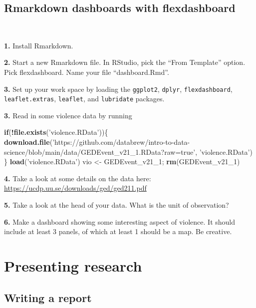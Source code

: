 \documentclass[]{book}
\newenvironment{Shaded}{\begin{snugshade}}{\end{snugshade}}
\newcommand{\ControlFlowTok}[1]{\textcolor[rgb]{0.13,0.29,0.53}{\textbf{#1}}}
\newcommand{\DecValTok}[1]{\textcolor[rgb]{0.00,0.00,0.81}{#1}}
\newcommand{\KeywordTok}[1]{\textcolor[rgb]{0.13,0.29,0.53}{\textbf{#1}}}
\newcommand{\NormalTok}[1]{#1}
\newcommand{\OperatorTok}[1]{\textcolor[rgb]{0.81,0.36,0.00}{\textbf{#1}}}
\newcommand{\StringTok}[1]{\textcolor[rgb]{0.31,0.60,0.02}{#1}}
\begin{document}
\hypertarget{rmarkdown-dashboards-with-flexdashboard}{%
\chapter{Rmarkdown dashboards with flexdashboard}\label{rmarkdown-dashboards-with-flexdashboard}}

~

\textbf{1.} Install Rmarkdown.

\textbf{2.} Start a new Rmarkdown file. In RStudio, pick the ``From Template'' option. Pick flexdashboard. Name your file ``dashboard.Rmd''.

\textbf{3.} Set up your work space by loading the \texttt{ggplot2}, \texttt{dplyr}, \texttt{flexdashboard}, \texttt{leaflet.extras}, \texttt{leaflet}, and \texttt{lubridate} packages.

\textbf{3.} Read in some violence data by running

\begin{Shaded}
\begin{Highlighting}[]
\ControlFlowTok{if}\NormalTok{(}\OperatorTok{!}\KeywordTok{file.exists}\NormalTok{(}\StringTok{'violence.RData'}\NormalTok{))\{}
  \KeywordTok{download.file}\NormalTok{(}\StringTok{'https://github.com/databrew/intro-to-data-science/blob/main/data/GEDEvent_v21_1.RData?raw=true'}\NormalTok{, }\StringTok{'violence.RData'}\NormalTok{)}
\NormalTok{\}}
\KeywordTok{load}\NormalTok{(}\StringTok{'violence.RData'}\NormalTok{)}
\NormalTok{vio <-}\StringTok{ }\NormalTok{GEDEvent_v21_}\DecValTok{1}\NormalTok{; }\KeywordTok{rm}\NormalTok{(GEDEvent_v21_}\DecValTok{1}\NormalTok{)}
\end{Highlighting}
\end{Shaded}

\textbf{4.} Take a look at some details on the data here: \url{https://ucdp.uu.se/downloads/ged/ged211.pdf}

\textbf{5.} Take a look at the head of your data. What is the unit of observation?

\textbf{6.} Make a dashboard showing some interesting aspect of violence. It should include at least 3 panels, of which at least 1 should be a map. Be creative.

\hypertarget{part-presenting-research}{%
\part{Presenting research}\label{part-presenting-research}}

\hypertarget{writing-a-report}{%
\chapter{Writing a report}\label{writing-a-report}}
\end{document}
